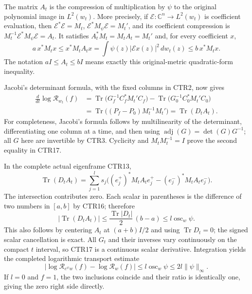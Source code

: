 The matrix $A_t$ is the compression of multiplication by $\psi$ to
the original polynomial image in $L^2(w_t)$. More precisely, if
$\mathcal E:\mathbb C^n\to L^2(w_t)$ is coefficient evaluation, then
$\mathcal E^*\mathcal E=M_t$,
$\mathcal E^*M_\psi\mathcal E=M_t'$, and its coefficient compression is
$M_t^{-1}\mathcal E^*M_\psi\mathcal E=A_t$.
It satisfies $A_t^*M_t=M_tA_t=M_t'$ and, for every coefficient $x$,
\[
 a\,x^*M_tx\leq x^*M_tA_tx
   =\int\psi(z)|\mathcal Ex(z)|^2\,dw_t(z)
 \leq b\,x^*M_tx.
 \tag{CTR16}
\]
The notation $aI\leq A_t\leq bI$ means exactly this original-metric
quadratic-form inequality.

Jacobi's determinant formula, with the fixed columns in CTR2, now gives
\[
 \begin{split}
 \frac{d}{dt}\log\mathcal R_{w_t}(f)
 &=\operatorname{Tr}\bigl(G_f^{-1}C_f^*M_t'C_f\bigr)
   -\operatorname{Tr}\bigl(G_0^{-1}C_0^*M_t'C_0\bigr)\\
 &=\operatorname{Tr}\bigl((P_f-P_0)M_t^{-1}M_t'\bigr)
   =\operatorname{Tr}(D_tA_t).
 \end{split}
 \tag{CTR17}
\]
For completeness, Jacobi's formula follows by multilinearity of the
determinant, differentiating one column at a time, and then using
$\operatorname{adj}(G)=\det(G)G^{-1}$; all $G$ here are invertible by
CTR3. Cyclicity and $M_tM_t^{-1}=I$ prove the second equality in CTR17.

In the complete actual eigenframe CTR13,
\[
 \operatorname{Tr}(D_tA_t)
 =\sum_{j=1}^l s_j
   \bigl((e_j^+)^*M_tA_te_j^+-(e_j^-)^*M_tA_te_j^-\bigr).
 \tag{CTR18}
\]
The intersection contributes zero. Each scalar in parentheses is the
difference of two numbers in $[a,b]$ by CTR16; therefore
\[
 |\operatorname{Tr}(D_tA_t)|
 \leq\frac{\operatorname{Tr}|D_t|}{2}\,(b-a)
 \leq l\operatorname{osc}_w\psi.
 \tag{CTR19}
\]
This also follows by centering $A_t$ at $(a+b)I/2$ and using
$\operatorname{Tr}D_t=0$; the signed scalar cancellation is exact.
All $G_t$ and their inverses vary continuously on the compact $t$
interval, so CTR17 is a continuous scalar derivative. Integration yields
the completed logarithmic transport estimate
\[
 \boxed{
 \left|\log\mathcal R_{e^\psi w}(f)-\log\mathcal R_w(f)\right|
 \leq l\operatorname{osc}_w\psi
 \leq2l\|\psi\|_\infty.}
 \tag{CTR20}
\]
If $l=0$ and $f=1$, the two inclusions coincide and their ratio is
identically one, giving the zero right side directly.

